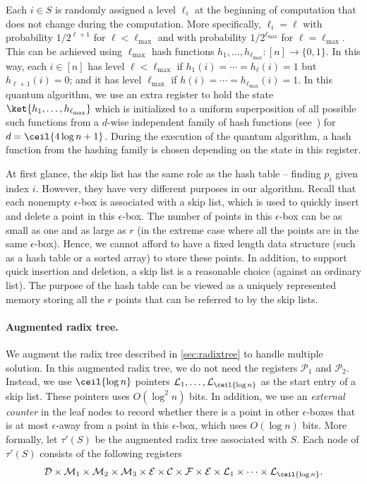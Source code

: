 Each $i \in S$ is randomly assigned a level $\ell_i$ at the beginning of computation that does not change during the computation. More specifically, $\ell_i = \ell$ with probability $1/2^{\ell+1}$ for $\ell < \ell_{\max}$ and with probability $1/2^{\ell_{\max}}$ for $\ell = \ell_{\max}$. This can be achieved using $\ell_{\max}$ hash functions $h_1, \ldots, h_{\ell_{\max}} : [n] \rightarrow \{0, 1\}$. In this way, each $i \in [n]$ has level $\ell<\ell_{\max}$ if $h_1(i) = \cdots = h_\ell(i) = 1$ but $h_{\ell+1}(i) = 0$; and it has level $\ell_{\max}$ if $h(i) = \cdots = h_{\ell_{\max}}(i) = 1$. In this quantum algorithm, we use an extra register to hold the state $\ket{h_1,\ldots,h_{\ell_{\max}}}$ which is initialized to a uniform superposition of all possible such functions from a $d$-wise independent family of hash functions (see~\cite[Theorem 1]{r5}) for $d = \ceil{4 \log n + 1}$. During the execution of the quantum algorithm, a hash function from the hashing family is chosen depending on the state in this register.

At first glance, the skip list has the same role as the hash table -- finding $p_i$ given index $i$. 
However, they have very different purposes in our algorithm. Recall that each nonempty $\epsilon$-box is associated with a skip list, which is used to quickly insert and delete a point in this $\epsilon$-box. The number of points in this $\epsilon$-box can be as small as one and as large as $r$ (in the extreme case where all the points are in the same $\epsilon$-box).
Hence, we cannot afford to have a fixed length data structure (such as a hash table or a sorted array) to store these points. In addition, to support quick insertion and deletion, a skip list is a reasonable choice (against an ordinary list). The purpose of the hash table can be viewed as a uniquely represented memory storing all the $r$ points that can be referred to by the skip lists.

\paragraph{Augmented radix tree.}
We augment the radix tree described in \cref{sec:radixtree} to handle multiple solution. In this augmented radix tree, we do not need the registers $\mathcal{P}_1$ and $\mathcal{P}_2$. Instead, we use $\ceil{\log n}$ pointers $\mathcal{L}_1, \ldots, \mathcal{L}_{\ceil{\log n}}$ as the start entry of a skip list. These pointers uses $O(\log^2 n)$ bits. In addition, we use an \emph{external counter} in the leaf nodes to record whether there is a point in other $\epsilon$-boxes that is at most $\epsilon$-away from a point in this $\epsilon$-box, which uses $O(\log n)$ bits. More formally, let $\tau'(S)$ be the augmented radix tree associated with $S$. 
Each node of $\tau'(S)$ consists of the following registers
\begin{align}
  \mathcal{D} \times \mathcal{M}_1 \times \mathcal{M}_2 \times \mathcal{M}_3 \times \mathcal{E} \times \mathcal{C} \times \mathcal{F} \times \mathcal{E} \times \mathcal{L}_1 \times \cdots \times \mathcal{L}_{\ceil{\log n}}.
\end{align}

